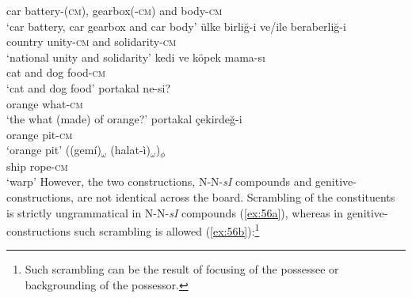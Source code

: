 \documentclass[output=paper]{LSP/langsci}
\begin{document}
		car battery-(\textsc{cm}), gearbox(-\textsc{cm}) and body-\textsc{cm}\\
	\glt `car battery, car gearbox and car body'
\z
\ea\label{ex:53}
	\ea\label{ex:53a}
	\gll ülke birliğ-i ve/ile beraberliğ-i\\
			country  unity-\textsc{cm} and    solidarity-\textsc{cm}\\
	\glt `national unity and solidarity'
	\ex\label{ex:53b}
		\gll kedi ve köpek mama-sı\\
			cat and dog food-\textsc{cm}\\
		\glt `cat and dog food'
	\z
\z
\ea\label{ex:54}
	\ea\label{ex:54a}
		\gll portakal ne-si?\\
			orange what-\textsc{cm}\\
		\glt `the what (made) of orange?'
	\ex\label{ex:54b}
		\gll portakal çekirdeğ-i\\
			orange pit-\textsc{cm}\\
		\glt `orange pit'
	\z
\z
\ea\label{ex:55}
	\gll	((gemí)$_{\omega}$ (halat-\`{i})$_{\omega}$)$_{\phi}$\\
			ship rope-\textsc{cm}\\
	\glt `warp'
\z
However, the two constructions, N-N-\textit{sI} compounds and genitive- constructions, are not identical across the board. Scrambling of the constituents is strictly ungrammatical in N-N-\textit{sI} compounds \citep{BagriacikRalli2015} (\ref{ex:56a}), whereas in genitive- constructions such scrambling is allowed (\ref{ex:56b}):\footnote{Such scrambling can be the result of focusing of the possessee or backgrounding of the possessor.}
\ea\label{ex:56}
	\z
\z
\end{document}
